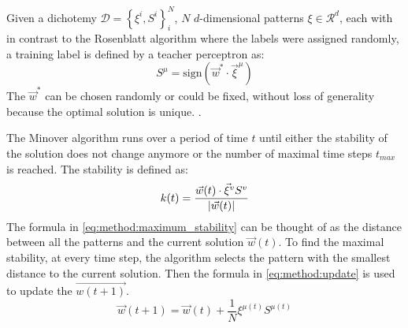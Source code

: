 Given a dichotemy $\mathcal{D} = \left\{\xi^i, S^i \right\}_{i}^{N}$, $N$ $d$-dimensional patterns $\xi \in \mathcal{R}^d$, each with in contrast to the Rosenblatt algorithm where the labels were assigned randomly, a training label is defined by a teacher perceptron as:
\begin{equation}
	S^\mu = \text{sign}(\vec{w}^* \cdot {\vec{\xi}}^{\mu})
\end{equation}
The $\vec{w}^*$ can be chosen randomly or could be fixed, without loss of generality because the optimal solution is unique. .

The Minover algorithm runs over a period of time $t$ until either the stability of the solution does not change anymore or the number of maximal time steps $t_{max}$ is reached. The  stability is defined as: 
\begin{equation}\label{eq:method:maximum_stability}
\mathnormal{k}(t) = \frac{\vec{w}(t) \cdot \vec{\xi}^v S^v}{|\vec{w}(t)|}
\end{equation} 
The formula in \eqref{eq:method:maximum_stability} can be thought of as the distance between all the patterns and the current solution $\vec{w}(t)$. To find the maximal stability, at every time step, the algorithm selects the pattern with the smallest distance to the current solution. Then the formula in \eqref{eq:method:update} is used to update the $\vec{w(t + 1)}$.
\begin{equation}\label{eq:method:update}
	\vec{w}(t + 1) = \vec{w}(t) + \frac{1}{N} \xi^{\mu(t)} S^{\mu(t)} 
\end{equation}
